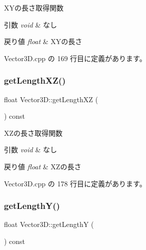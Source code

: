 X\+Yの長さ取得関数 


\begin{DoxyParams}{引数}
{\em void} & なし \\
\hline
\end{DoxyParams}

\begin{DoxyRetVals}{戻り値}
{\em float} & X\+Yの長さ \\
\hline
\end{DoxyRetVals}


 Vector3\+D.\+cpp の 169 行目に定義があります。

\mbox{\label{class_vector3_d_ab4884482e69fd58473794e1c260f93e8}} 
\subsubsection{\texorpdfstring{get\+Length\+X\+Z()}{getLengthXZ()}}
{\footnotesize\ttfamily float Vector3\+D\+::get\+Length\+XZ (\begin{DoxyParamCaption}{ }\end{DoxyParamCaption}) const}



X\+Zの長さ取得関数 


\begin{DoxyParams}{引数}
{\em void} & なし \\
\hline
\end{DoxyParams}

\begin{DoxyRetVals}{戻り値}
{\em float} & X\+Zの長さ \\
\hline
\end{DoxyRetVals}


 Vector3\+D.\+cpp の 178 行目に定義があります。

\mbox{\label{class_vector3_d_a0f475f8ffd361c5571bc57cb0c72a551}} 
\subsubsection{\texorpdfstring{get\+Length\+Y()}{getLengthY()}}
{\footnotesize\ttfamily float Vector3\+D\+::get\+LengthY (\begin{DoxyParamCaption}{ }\end{DoxyParamCaption}) const}



